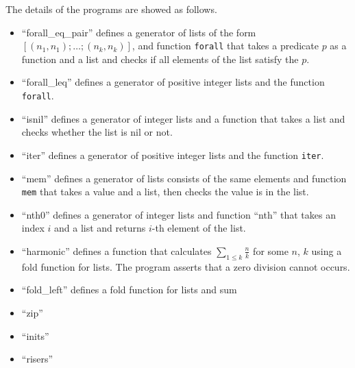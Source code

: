 The details of the programs are showed as follows.
\begin{itemize}
\item ``forall\_eq\_pair'' defines a generator of lists of the form
      $[(n_1,n_1);\dots;(n_k,n_k)]$, and function \texttt{forall} that
      takes a predicate $p$ as a function and a list and checks if all
      elements of the list satisfy the $p$.
\item ``forall\_leq'' defines a generator of positive integer lists and
      the function \texttt{forall}.
\item ``isnil'' defines a generator of integer lists and a function that
      takes a list and checks whether the list is nil or not.
\item ``iter'' defines a generator of positive integer lists and the
      function \texttt{iter}.
\item ``mem'' defines a generator of lists consists of the same elements
      and function \texttt{mem} that takes a value and a list, then
      checks the value is in the list.
\item ``nth0'' defines a generator of integer lists and function
      ``nth'' that takes an index $i$ and a list and returns $i$-th element of the list.
\item ``harmonic'' defines a function that calculates $\sum_{1 \leq k}
      \frac{n}{k}$ for some $n$, $k$ using a fold function for lists.
      The program asserts that a zero division cannot occurs.
\item ``fold\_left'' defines a fold function for lists and sum
\item ``zip''
\item ``inits''
\item ``risers''
\end{itemize}

